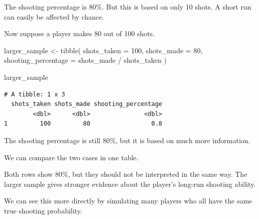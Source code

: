 \documentclass[
  letterpaper,
  DIV=11,
  numbers=noendperiod]{scrreprt}
\newenvironment{Shaded}{\begin{snugshade}}{\end{snugshade}}
\newcommand{\AttributeTok}[1]{\textcolor[rgb]{0.40,0.45,0.13}{#1}}
\newcommand{\DecValTok}[1]{\textcolor[rgb]{0.68,0.00,0.00}{#1}}
\newcommand{\FunctionTok}[1]{\textcolor[rgb]{0.28,0.35,0.67}{#1}}
\newcommand{\NormalTok}[1]{\textcolor[rgb]{0.00,0.23,0.31}{#1}}
\newcommand{\OtherTok}[1]{\textcolor[rgb]{0.00,0.23,0.31}{#1}}
\newcommand{\SpecialCharTok}[1]{\textcolor[rgb]{0.37,0.37,0.37}{#1}}
\begin{document}
The shooting percentage is 80\%. But this is based on only 10 shots. A
short run can easily be affected by chance.

Now suppose a player makes 80 out of 100 shots.

\begin{Shaded}
\begin{Highlighting}[]
\NormalTok{larger\_sample }\OtherTok{\textless{}{-}} \FunctionTok{tibble}\NormalTok{(}
  \AttributeTok{shots\_taken =} \DecValTok{100}\NormalTok{,}
  \AttributeTok{shots\_made =} \DecValTok{80}\NormalTok{,}
  \AttributeTok{shooting\_percentage =}\NormalTok{ shots\_made }\SpecialCharTok{/}\NormalTok{ shots\_taken}
\NormalTok{)}

\NormalTok{larger\_sample}
\end{Highlighting}
\end{Shaded}

\begin{verbatim}
# A tibble: 1 x 3
  shots_taken shots_made shooting_percentage
        <dbl>      <dbl>               <dbl>
1         100         80                 0.8
\end{verbatim}

The shooting percentage is still 80\%, but it is based on much more
information.

We can compare the two cases in one table.

\begin{table}

\caption{\label{tbl-small-large-samples}The same percentage can carry
different amounts of evidence}


\end{table}%

Both rows show 80\%, but they should not be interpreted in the same way.
The larger sample gives stronger evidence about the player's long-run
shooting ability.

We can see this more directly by simulating many players who all have
the same true shooting probability.
\end{document}
